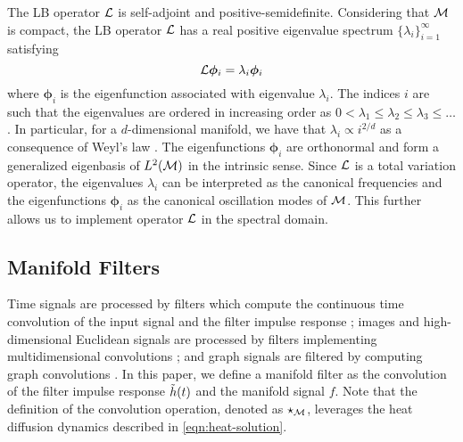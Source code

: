 The LB operator ${\mathcal L}$ is self-adjoint and positive-semidefinite. Considering that ${\mathcal M}$ is compact, the LB operator ${\mathcal L}$ has a real positive eigenvalue spectrum $\{\lambda_i\}_{i=1}^\infty$ satisfying
\begin{equation}\label{eqn:laplacian-decomp}
{\ensuremath{\mathcal L}} \bm\phi_i =\lambda_i \bm\phi_i
\end{equation}
where $\bm\phi_i$ is the eigenfunction associated with eigenvalue $\lambda_i$. The indices $i$ are such that the eigenvalues are ordered in increasing order as $0<\lambda_1\leq \lambda_2\leq \lambda_3\leq \hdots$. In particular, for a $d$-dimensional manifold, we have that $\lambda_i \propto i^{2/d}$ as a consequence of Weyl's law \cite{arendt2009weyl}. The eigenfunctions $\bm\phi_i$ are orthonormal and form a generalized eigenbasis of $L^2({\mathcal M})$ in the intrinsic sense. Since ${\mathcal L}$ is a total variation operator, the eigenvalues $\lambda_i$ can be interpreted as the canonical frequencies and the eigenfunctions $\bm\phi_i$ as the canonical oscillation modes of ${\mathcal M}$. This further allows us to implement operator ${\mathcal L}$ in the spectral domain.



\subsection{Manifold Filters}\label{sec_manifold_filters}
Time signals are processed by filters which compute the continuous time convolution of the input signal and the filter impulse response \cite{oppenheim1997signals};
images and high-dimensional Euclidean signals are processed by filters implementing multidimensional convolutions \cite{bishop2006pattern}; and graph signals are filtered by computing graph convolutions \cite{gama2020graphs}. In this paper, we define a manifold filter as the convolution of the filter impulse response ${\tilde h}(t)$ and the manifold signal $f$. Note that the definition of the convolution operation, denoted as $\star_{\mathcal M}$, leverages the heat diffusion dynamics described in \eqref{eqn:heat-solution}. 



